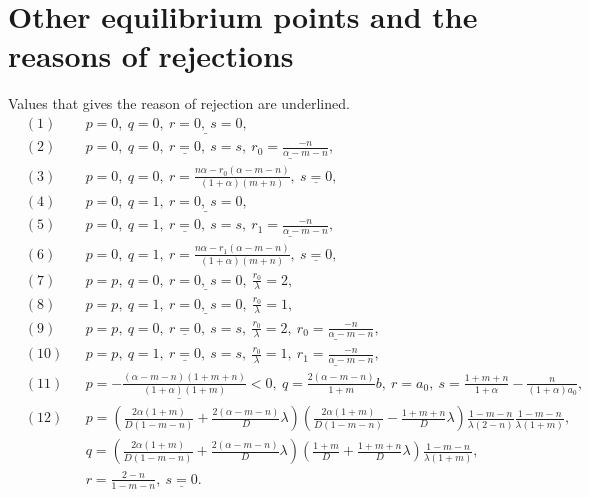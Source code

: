 \documentclass[a4paper,11pt]{article}
\begin{document}
\section{Other equilibrium points and the reasons of rejections}\label{append:equi_reject}
Values that gives the reason of rejection are underlined.
\begin{align*}
 &(1) & & p=0, \ q=0, \ \underline{ r=0, \ s=0},\\
 &(2) & & p=0, \ q=0, \ \underline{ r=0},\ s=s, \ \underline{ r_0 = \frac{-n}{\alpha-m-n}},\\
 &(3) & & p=0, \ q=0, \ r = \frac{n\alpha - r_0(\alpha-m-n)}{(1+\alpha)(m+n)},\ \underline{ s=0},\\
 &(4) & & p=0, \ q=1, \ \underline{ r=0, \ s=0}, \\
 &(5) & & p=0, \ q=1, \ \underline{ r=0},\ s=s, \ \underline{ r_1 = \frac{-n}{\alpha-m-n}},\\
 &(6) & & p=0, \ q=1, \ r = \frac{n\alpha - r_1(\alpha-m-n)}{(1+\alpha)(m+n)},\ \underline{ s=0},\\
 &(7) & & p=p, \ q=0, \ \underline{ r=0, \ s=0}, \ \frac{r_0}{\lambda}=2, \\ 
 &(8) & & p=p, \ q=1, \ \underline{ r=0, \ s=0}, \ \frac{r_0}{\lambda}=1, \\
 &(9) & & p=p, \ q=0, \ \underline{ r=0}, \ s=s, \ \frac{r_0}{\lambda}=2, \ \underline{ r_0 = \frac{-n}{\alpha-m-n}}, \\
 &(10) & & p=p, \ q=1, \ \underline{ r=0}, \ s=s, \ \frac{r_0}{\lambda}=1, \ \underline{ r_1 = \frac{-n}{\alpha-m-n}}, \\
 &(11) & & \underline{ p=-\frac{(\alpha-m-n)(1+m+n)}{(1+\alpha)(1+m)}<0}, \ q=\frac{2(\alpha-m-n)}{1+m}b, \ r=a_0, \ s=\frac{1+m+n}{1+\alpha} - \frac{n}{(1+\alpha)a_0},\\
 &(12) & & p=\left( \frac{2\alpha(1+m)}{D(1-m-n)} + \frac{2(\alpha-m-n)}{D}\lambda\right)\left(\frac{2\alpha(1+m)}{D(1-m-n)} - \frac{1+m+n}{D}\lambda\right)\frac{1-m-n}{\lambda(2-n)}\frac{1-m-n}{\lambda(1+m)}, \\
 & & &q=\left( \frac{2\alpha(1+m)}{D(1-m-n)} + \frac{2(\alpha-m-n)}{D}\lambda\right)\left(\frac{1+m}{D} + \frac{1+m+n}{D}\lambda\right)\frac{1-m-n}{\lambda(1+m)},\\
 & & &r = \frac{2-n}{1-m-n}, \ \underline{ s=0}.
\end{align*}
\end{document}
